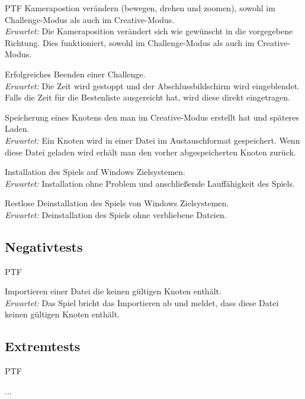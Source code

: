 \begin{ids}{\gls{PTF}}
		\id[ 80] Kamerapostion verändern (bewegen, drehen und zoomen), sowohl im Challenge-Modus als auch im Creative-Modus.\\
		
		\textit{Erwartet:} Die Kameraposition verändert sich wie gewünscht in die vorgegebene Richtung. Dies funktioniert, sowohl im Challenge-Modus als auch im Creative-Modus.

		\id[ 90] Erfolgreiches Beenden einer Challenge.\\
		
		\textit{Erwartet:} Die Zeit wird gestoppt und der Abschlussbildschirm wird eingeblendet. Falls die Zeit für die Bestenliste ausgereicht hat, wird diese direkt eingetragen.

		\id[100] Speicherung eines Knotens den man im Creative-Modus erstellt hat und späteres Laden.\\
		
		\textit{Erwartet:} Ein Knoten wird in einer Datei im Austauschformat gespeichert. Wenn diese Datei geladen wird erhält man den vorher abgespeicherten Knoten zurück.
		
		\id[120] Installation des Spiels auf Windows Zielsystemen.\\
		
		\textit{Erwartet:} Installation ohne Problem und anschließende Lauffähigkeit des Spiels.

		\id[130] Restlose Deinstallation des Spiels von Windows Zielsystemen.\\
		
		\textit{Erwartet:} Deinstallation des Spiels ohne verbliebene Dateien.

	\end{ids}


\clearpage


%
%
\subsection{Negativtests}

\begin{ids}{\gls{PTF}}

	\id[500] Importieren einer Datei die keinen gültigen Knoten enthält.\\
	
	\textit{Erwartet:} Das Spiel bricht das Importieren ab und meldet, dass diese Datei keinen gültigen Knoten enthält.

\end{ids}


\clearpage


%
%
\subsection{Extremtests}

	\begin{ids}{\gls{PTF}}
	
		\id[1000] ...
	
	\end{ids}




%
%
%
